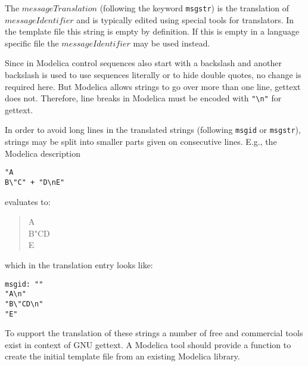 \begin{nonnormative}
The $\mathit{messageTranslation}$ (following the keyword \lstinline!msgstr!) is the translation of $\mathit{messageIdentifier}$ and is typically edited using special tools for translators.
In the template file this string is empty by definition.
If this is empty in a language specific file the $\mathit{messageIdentifier}$ may be used instead.
\end{nonnormative}

\begin{nonnormative}
Since in Modelica control sequences also start with a backslash and another backslash is used to use sequences literally or to hide double quotes, no change is required here.
But Modelica allows strings to go over more than one line, gettext does not.
Therefore, line breaks in Modelica must be encoded with \lstinline!"\n"! for gettext.

In order to avoid long lines in the translated strings (following \lstinline!msgid! or \lstinline!msgstr!), strings may be split into smaller parts given on consecutive lines.
E.g., the Modelica description
\begin{lstlisting}
"A
B\"C" + "D\nE"
\end{lstlisting}
evaluates to:
\begin{quotation}
A\\
B"CD\\
E
\end{quotation}
which in the translation entry looks like:
\begin{lstlisting}
msgid: ""
"A\n"
"B\"CD\n"
"E"
\end{lstlisting}
\end{nonnormative}

\begin{nonnormative}
To support the translation of these strings a number of free and commercial tools exist in context of GNU gettext.
A Modelica tool should provide a function to create the initial template file from an existing Modelica library.
\end{nonnormative}

